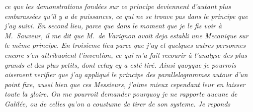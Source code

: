 %
%
\textit{ce que les demonstrations fondées sur ce principe deviennent d'autant plus embarassées qu'il y a de puissances, ce qui ne se trouve pas dans le principe que j'ay suivi. 
En second lieu, parce que dans le moment que je le fis voir à M.~Sauveur\protect{},} \textit{il me dit que M.\ de Varignon\protect{} 
avoit deja establi une Mecanique sur le même principe. En troisieme lieu parce que j'ay}
%
%
\textit{et quelques autres personnes encore s'en attribuoient l'invention, 
ce qui m'a fait recourir à l'analyse des plus grands et} des 
%
\textit{plus petits, dont celuy cy a esté tiré. Ainsi quoyque je pourrois aisement verifier que j'ay appliqué 
le principe des parallelogrammes\protect{}}
\pend
\newpage
\count{}%
\count{}%
\count{} 
\pstart
\noindent \textit{autour d'un point fixe, aussi bien que ces Messieurs, 
j'aime mieux cependant leur en laisser toute la gloire.}
\pend
%
\pstart
\hspace{1mm}\hspace{-1mm}%
%
%
%
%
\textit{On me pourroit demander pourquoy je ne rapporte aucune}
%
%
\textit{de Galilée\protect{}, ou de celles qu'on a coustume de tirer de son systeme. Je reponds}
